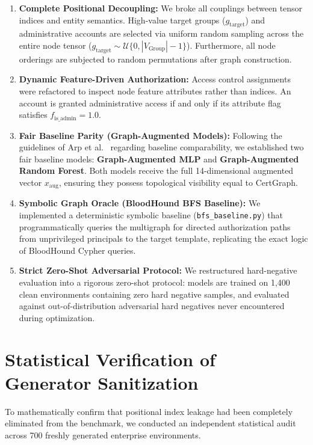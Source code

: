 \begin{enumerate}
    \item \textbf{Complete Positional Decoupling:} We broke all couplings between tensor indices and entity semantics. High-value target groups ($g_{\text{target}}$) and administrative accounts are selected via uniform random sampling across the entire node tensor ($g_{\text{target}} \sim \mathcal{U}\{0, |V_{\text{Group}}|-1\}$). Furthermore, all node orderings are subjected to random permutations after graph construction.
    \item \textbf{Dynamic Feature-Driven Authorization:} Access control assignments were refactored to inspect node feature attributes rather than indices. An account is granted administrative access if and only if its attribute flag satisfies $f_{\text{is\_admin}} = 1.0$.
    \item \textbf{Fair Baseline Parity (Graph-Augmented Models):} Following the guidelines of Arp et al.~\cite{arp2022dos} regarding baseline comparability, we established two fair baseline models: \textbf{Graph-Augmented MLP} and \textbf{Graph-Augmented Random Forest}. Both models receive the full 14-dimensional augmented vector $x_{\text{aug}}$, ensuring they possess topological visibility equal to CertGraph.
    \item \textbf{Symbolic Graph Oracle (BloodHound BFS Baseline):} We implemented a deterministic symbolic baseline (\texttt{bfs\_baseline.py}) that programmatically queries the multigraph for directed authorization paths from unprivileged principals to the target template, replicating the exact logic of BloodHound Cypher queries.
    \item \textbf{Strict Zero-Shot Adversarial Protocol:} We restructured hard-negative evaluation into a rigorous zero-shot protocol: models are trained on 1,400 clean environments containing zero hard negative samples, and evaluated against out-of-distribution adversarial hard negatives never encountered during optimization.
\end{enumerate}

\section{Statistical Verification of Generator Sanitization}
To mathematically confirm that positional index leakage had been completely eliminated from the benchmark, we conducted an independent statistical audit across 700 freshly generated enterprise environments.

